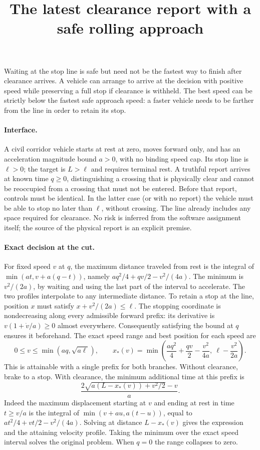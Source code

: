 \documentclass[11pt]{article}
\title{The latest clearance report with a safe rolling approach}
\begin{document}
\maketitle

Waiting at the stop line is safe but need not be the fastest way to
finish after clearance arrives. A vehicle can arrange to arrive at the
decision with positive speed while preserving a full stop if clearance
is withheld. The best speed can be strictly below the fastest safe
approach speed: a faster vehicle needs to be farther from the line
in order to retain its stop.

\paragraph{Interface.}
A civil corridor vehicle starts at rest at zero, moves forward only,
and has an acceleration magnitude bound \(a>0\), with no binding
speed cap. Its stop line is \(\ell>0\); the target is \(L>\ell\)
and requires terminal rest. A truthful report arrives at known time
\(q\ge0\), distinguishing a crossing that is physically clear and
cannot be reoccupied from a crossing that must not be entered.
Before that report, controls must be identical. In the latter
case (or with no report) the vehicle must be able to stop no later
than \(\ell\), without crossing. The line already includes any
space required for clearance. No risk is inferred from the
software assignment itself; the source of the physical report is
an explicit premise.

\paragraph{Exact decision at the cut.}
For fixed speed \(v\) at \(q\), the maximum distance traveled from
rest is the integral of
\(\min(at,v+a(q-t))\), namely
\(a q^2/4+qv/2-v^2/(4a)\). The minimum is \(v^2/(2a)\),
by waiting and using the last part of the interval to accelerate.
The two profiles interpolate to any intermediate distance. To
retain a stop at the line, position \(x\) must satisfy
\(x+v^2/(2a)\le\ell\). The stopping coordinate is nondecreasing
along every admissible forward prefix:
its derivative is \(v(1+\dot v/a)\ge0\) almost everywhere.
Consequently satisfying the bound at \(q\) ensures it beforehand.
The exact speed range and best position for each speed are
\[
  0\le v\le\min(aq,\sqrt{a\ell}), \qquad
  x_*(v)=\min\left(\frac{a q^2}{4}+\frac{qv}{2}
                     -\frac{v^2}{4a},\ \ell-\frac{v^2}{2a}\right).
\]
This is attainable with a single prefix for both branches.
Without clearance, brake to a stop. With clearance, the minimum
additional time at this prefix is
\[
   \frac{2\sqrt{a(L-x_*(v))+v^2/2}-v}{a}.
\]
Indeed the maximum displacement starting at \(v\) and ending at
rest in time \(t\ge v/a\) is the integral of
\(\min(v+au,a(t-u))\), equal to
\(at^2/4+vt/2-v^2/(4a)\). Solving at distance \(L-x_*(v)\) gives
the expression and the attaining velocity profile. Taking the
minimum over the exact speed interval solves the original problem.
When \(q=0\) the range collapses to zero.
\end{document}
